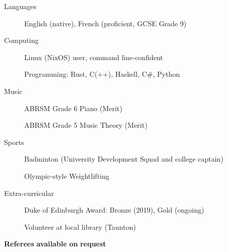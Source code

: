\documentclass[
  11pt,
  a4paper,
]{article}
\newcommand{\itemspace}{0.8ex}
\begin{document}
\vspace{\itemspace}

\begin{description}
\item[Languages]
English (native), French (proficient, GCSE Grade 9)
\item[Computing]
Linux (NixOS) user, command line-confident

Programming: Rust, C(++), Haskell, C\#, Python
\item[Music]
ABRSM Grade 6 Piano (Merit)

ABRSM Grade 5 Music Theory (Merit)
\item[Sports]
Badminton (University Development Squad and college captain)

Olympic-style Weightlifting
\item[Extra-curricular]
Duke of Edinburgh Award: Bronze (2019), Gold (ongoing)

Volunteer at local library (Taunton)
\end{description}

\vspace{2.0ex}\begin{center}

\textbf{Referees} \textbf{available} \textbf{on} \textbf{request}

\end{center}
\end{document}
